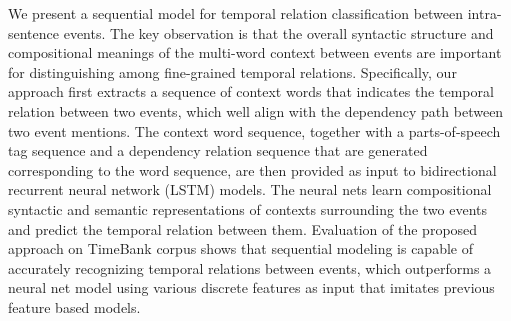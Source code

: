 We present a sequential model for temporal relation classification between intra-sentence events. The key observation is that the overall syntactic structure and compositional meanings of the multi-word context between events are important for distinguishing among fine-grained temporal relations. Specifically, our approach first extracts a sequence of context words that indicates the temporal relation between two events, which well align with the dependency path between two event mentions. The context word sequence, together with a parts-of-speech tag sequence and a dependency relation sequence that are generated corresponding to the word sequence, are then provided as input to bidirectional recurrent neural network (LSTM) models. The neural nets learn compositional syntactic and semantic representations of contexts surrounding the two events and predict the temporal relation between them. Evaluation of the proposed approach on TimeBank corpus shows that sequential modeling is capable of accurately recognizing temporal relations between events, which outperforms a neural net model using various discrete features as input that imitates previous feature based models.
